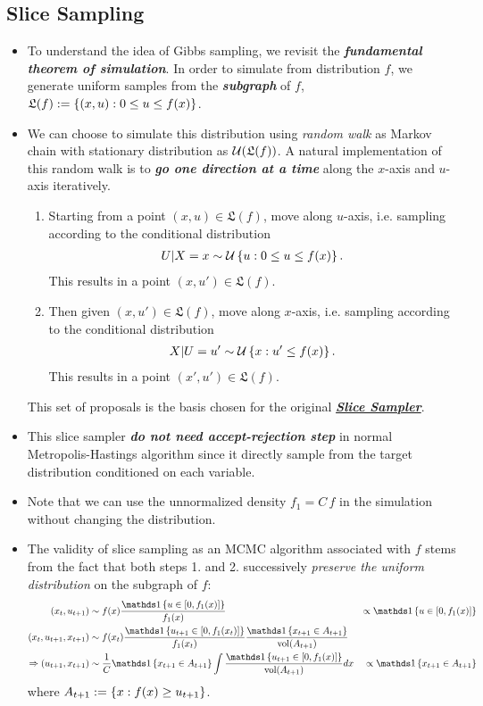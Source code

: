 \documentclass[11pt]{article}
\begin{document}
\subsection{Slice Sampling}
\begin{itemize}
\item To understand the idea of Gibbs sampling, we revisit the \emph{\textbf{fundamental theorem of simulation}}. In order to simulate from distribution $f$, we generate uniform samples from the \emph{\textbf{subgraph}} of $f$, $\mathfrak{L}(f) := \left\{(x,u): 0 \le u \le f(x)\right\}$.

\item We can choose to simulate this distribution using \emph{random walk} as Markov chain with stationary distribution as ${\mathcal U}(\mathfrak{L}(f))$. A natural implementation of this random walk is to \emph{\textbf{go one direction at a time}} along the $x$-axis and $u$-axis iteratively.
\begin{enumerate}
\item Starting from a point $(x, u) \in \mathfrak{L}(f)$, move along $u$-axis, i.e. sampling according to the conditional distribution
\begin{align*}
U|X = x \sim {\mathcal U}\left\{u: 0\le u\le f(x)\right\}.
\end{align*} This results in a point $(x, u') \in \mathfrak{L}(f)$.

\item Then given $(x, u') \in \mathfrak{L}(f)$, move along $x$-axis, i.e. sampling according to the conditional distribution
\begin{align*}
X|U = u' \sim {\mathcal U}\left\{x: u'\le f(x)\right\}.
\end{align*} This results in a point $(x', u') \in \mathfrak{L}(f)$.
\end{enumerate}
This set of proposals is the basis chosen for the original \underline{\emph{\textbf{Slice Sampler}}}.

\item This slice sampler \emph{\textbf{do not need accept-rejection step}} in normal Metropolis-Hastings algorithm since it directly sample from the target distribution conditioned on each variable.

\item Note that we can use the unnormalized density $f_1 = C\,f$ in the simulation without changing the distribution.

\item The validity of slice sampling as an MCMC algorithm associated with $f$ stems from the fact that both steps 1. and 2. successively \emph{preserve the uniform distribution} on the subgraph of $f$:
\begin{align*}
(x_t, u_{t+1}) &\sim f(x)\frac{\ind{u\in [0, f_1(x)]}}{f_1(x)} &\propto \ind{u\in [0, f_1(x)]} \\
(x_t, u_{t+1}, x_{t+1})& \sim f(x_t)\frac{\ind{u_{t+1}\in [0, f_1(x_t)]}}{f_1(x_t)}\frac{\ind{x_{t+1} \in A_{t+1}}}{\text{vol}(A_{t+1})}&\\
\Rightarrow (u_{t+1}, x_{t+1})&\sim \frac{1}{C}\ind{x_{t+1} \in A_{t+1}} \int \frac{\ind{u_{t+1}\in [0, f_1(x)]}}{\text{vol}(A_{t+1})} dx &\propto  \ind{x_{t+1} \in A_{t+1}}
\end{align*} where $A_{t+1} := \left\{x: f(x) \ge u_{t+1}\right\}$.


\end{itemize}
\end{document}
